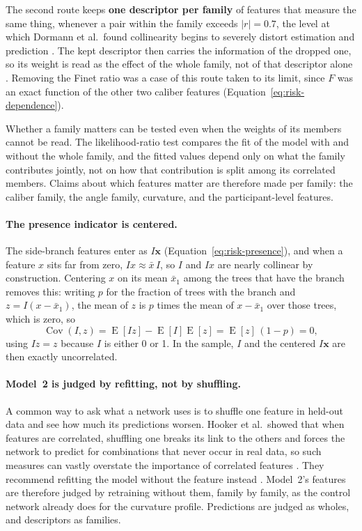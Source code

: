 The second route keeps \textbf{one descriptor per family} of features that measure the same thing, whenever a pair within the family exceeds $\lvert r \rvert = 0.7$, the level at which Dormann et al.\ found collinearity begins to severely distort estimation and prediction \cite{dormann2013collinearity}.
The kept descriptor then carries the information of the dropped one, so its weight is read as the effect of the whole family, not of that descriptor alone \cite{dormann2013collinearity}.
Removing the Finet ratio was a case of this route taken to its limit, since $F$ was an exact function of the other two caliber features (Equation~\ref{eq:risk-dependence}).

Whether a family matters can be tested even when the weights of its members cannot be read.
The likelihood-ratio test compares the fit of the model with and without the whole family, and the fitted values depend only on what the family contributes jointly, not on how that contribution is split among its correlated members.
Claims about which features matter are therefore made per family: the caliber family, the angle family, curvature, and the participant-level features.

\paragraph{The presence indicator is centered.}
The side-branch features enter as $I\mathbf{x}$ (Equation~\ref{eq:risk-presence}), and when a feature $x$ sits far from zero, $Ix \approx \bar{x}\,I$, so $I$ and $Ix$ are nearly collinear by construction.
Centering $x$ on its mean $\bar{x}_1$ among the trees that have the branch removes this: writing $p$ for the fraction of trees with the branch and $z = I(x - \bar{x}_1)$, the mean of $z$ is $p$ times the mean of $x - \bar{x}_1$ over those trees, which is zero, so
\begin{equation}
  \operatorname{Cov}(I, z) = \operatorname{E}[Iz] - \operatorname{E}[I]\operatorname{E}[z] = \operatorname{E}[z]\,(1 - p) = 0,
  \label{eq:risk-center}
\end{equation}
using $Iz = z$ because $I$ is either 0 or 1.
In the sample, $I$ and the centered $I\mathbf{x}$ are then exactly uncorrelated.

\paragraph{Model~2 is judged by refitting, not by shuffling.}
A common way to ask what a network uses is to shuffle one feature in held-out data and see how much its predictions worsen.
Hooker et al.\ showed that when features are correlated, shuffling one breaks its link to the others and forces the network to predict for combinations that never occur in real data, so such measures can vastly overstate the importance of correlated features \cite{hooker2021permutation}.
They recommend refitting the model without the feature instead \cite{hooker2021permutation}.
Model~2's features are therefore judged by retraining without them, family by family, as the control network already does for the curvature profile.
Predictions are judged as wholes, and descriptors as families.
